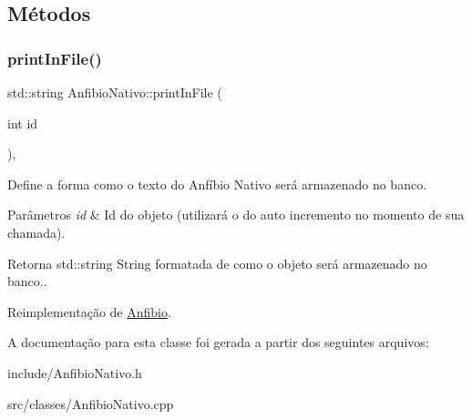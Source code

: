 \subsection{Métodos}
\mbox{\label{classAnfibioNativo_a7926e1af44542ee268e27dd3d862f583}} 
\subsubsection{\texorpdfstring{print\+In\+File()}{printInFile()}}
{\footnotesize\ttfamily std\+::string Anfibio\+Nativo\+::print\+In\+File (\begin{DoxyParamCaption}\item[{int}]{id }\end{DoxyParamCaption})\hspace{0.3cm}{\ttfamily [protected]}, {\ttfamily [virtual]}}



Define a forma como o texto do Anfíbio Nativo será armazenado no banco. 


\begin{DoxyParams}{Parâmetros}
{\em id} & Id do objeto (utilizará o do auto incremento no momento de sua chamada). \\
\hline
\end{DoxyParams}
\begin{DoxyReturn}{Retorna}
std\+::string String formatada de como o objeto será armazenado no banco.. 
\end{DoxyReturn}


Reimplementação de \hyperlink{classAnfibio_a46f3f30c89af05bcdd39abbe692d854f}{Anfibio}.



A documentação para esta classe foi gerada a partir dos seguintes arquivos\+:\begin{DoxyCompactItemize}
\item 
include/Anfibio\+Nativo.\+h\item 
src/classes/Anfibio\+Nativo.\+cpp\end{DoxyCompactItemize}
